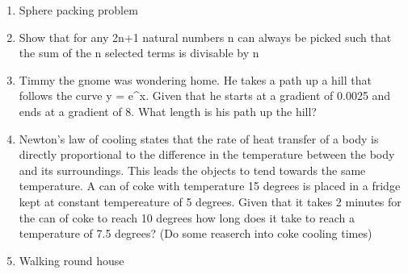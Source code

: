 \documentclass[a4paper]{article}
\begin{document}
\begin{enumerate}
\item
Sphere packing problem

\item
Show that for any 2n+1 natural numbers n can always be picked such that the sum of the n selected terms is divisable by n

\item
Timmy the gnome was wondering home. He takes a path up a hill that follows the curve y = e^x. Given that he starts at a gradient of 0.0025 and ends at a gradient of 8. What length is his path up the hill?

\item
Newton's law of cooling states that the rate of heat transfer of a body is directly proportional to the difference in the temperature between the body and its surroundings. This leads the objects to tend towards the same temperature. A can of coke with 
temperature 15 degrees is placed in a fridge kept at constant tempereature of 5 degrees. Given that it takes 2 minutes for the can of coke to reach 10 degrees how long does it take to reach a temperature of 7.5 degrees? (Do some reaserch into coke cooling times)

\item
Walking round house

\end{enumerate}
\end{document}
